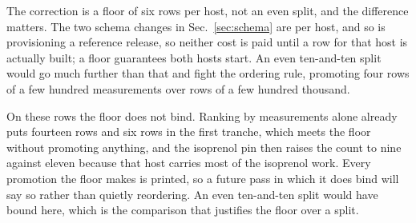 The correction is a floor of six rows per host, not an even split, and the difference
matters. The two schema changes in Sec.~\ref{sec:schema} are per host, and so is
provisioning a reference release, so neither cost is paid until a row for that host is
actually built; a floor guarantees both hosts start. An even ten-and-ten split would go
much further than that and fight the ordering rule, promoting four rows of a few hundred
measurements over rows of a few hundred thousand.

On these rows the floor does not bind. Ranking by measurements alone already puts
fourteen  rows and six  rows in the first tranche, which meets
the floor without promoting anything, and the isoprenol pin then raises the
 count to nine against eleven because that host carries most of the
isoprenol work. Every
promotion the floor makes is printed, so a future pass in which it does bind will say so
rather than quietly reordering. An even ten-and-ten split would have bound here, which is
the comparison that justifies the floor over a split.
